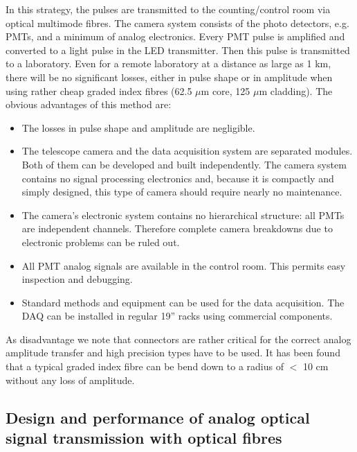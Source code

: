 \medskip In this strategy, the pulses are transmitted to the
counting/control room via optical multimode fibres. The camera system
consists of the photo detectors, e.g. PMTs, and a minimum of analog
electronics. Every PMT pulse is amplified and converted to a light pulse
in the LED transmitter. Then this pulse is transmitted to a laboratory. Even
for a remote laboratory at a distance as large as 1 km, there will be no
significant losses, either in pulse shape or in amplitude
when using rather cheap graded index fibres (62.5 $\mu$m core, 125 $\mu$m cladding). 
The obvious
advantages of this method are:

\begin{itemize}
\item  The losses in pulse shape and amplitude are negligible.

\item  The telescope camera and the data acquisition system are separated
modules. Both of them can be developed and built independently. The camera
system contains no signal processing electronics and, because it is
compactly and simply designed, this type of camera should require nearly no
maintenance.

\item  The camera's electronic system contains no hierarchical structure:
all PMTs are independent channels. Therefore complete camera breakdowns due
to electronic problems can be ruled out.

\item  All PMT analog signals are available in the control room. This permits
easy inspection and debugging.

\item  Standard methods and equipment can be used for the data 
acquisition. The DAQ can be
installed in regular 19'' racks using commercial components.
\end{itemize}

As disadvantage we note that connectors are rather critical for the correct analog
amplitude transfer and high precision types have to be used. It has been found that a
typical graded index fibre can be bend down to a radius of $<$ 10 cm without any loss of
amplitude.

\subsection{Design and performance of analog optical signal transmission
with optical fibres}


